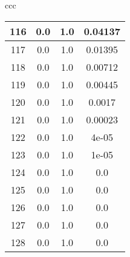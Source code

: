\documentclass{article}
\begin{document}
\begin{center}
\begin{tabular}{ccc}
\begin{tabular}{|c|c|c|c|}
            \hline
            116 & 0.0 & 1.0 & 0.04137 \\ 
            \hline
            117 & 0.0 & 1.0 & 0.01395 \\ 
            \hline
            118 & 0.0 & 1.0 & 0.00712 \\ 
            \hline
            119 & 0.0 & 1.0 & 0.00445 \\ 
            \hline
            120 & 0.0 & 1.0 & 0.0017 \\ 
            \hline
            121 & 0.0 & 1.0 & 0.00023 \\ 
            \hline
            122 & 0.0 & 1.0 & 4e-05 \\ 
            \hline
            123 & 0.0 & 1.0 & 1e-05 \\ 
            \hline
            124 & 0.0 & 1.0 & 0.0 \\ 
            \hline
            125 & 0.0 & 1.0 & 0.0 \\ 
            \hline
            126 & 0.0 & 1.0 & 0.0 \\ 
            \hline
            127 & 0.0 & 1.0 & 0.0 \\ 
            \hline
            128 & 0.0 & 1.0 & 0.0 \\ 
            \hline
            \end{tabular}

        \end{tabular}
        \end{center}
        \pagebreak
\end{document}
